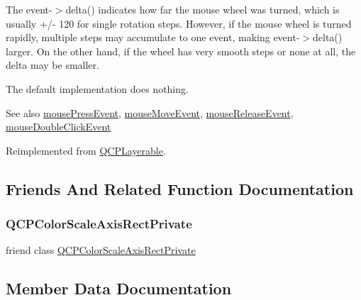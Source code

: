 The {\ttfamily event-\/$>$delta()} indicates how far the mouse wheel was turned, which is usually +/-\/ 120 for single rotation steps. However, if the mouse wheel is turned rapidly, multiple steps may accumulate to one event, making {\ttfamily event-\/$>$delta()} larger. On the other hand, if the wheel has very smooth steps or none at all, the delta may be smaller.

The default implementation does nothing.

\begin{DoxySeeAlso}{See also}
\hyperlink{class_q_c_p_color_scale_a91f633b97ffcd57fdf8cd814974c20e6}{mouse\+Press\+Event}, \hyperlink{class_q_c_p_color_scale_a3b2bd79725aefaf2630fc76e90939442}{mouse\+Move\+Event}, \hyperlink{class_q_c_p_color_scale_a6a35dd39ab4e5cb2d7b29ebb4d5b61b0}{mouse\+Release\+Event}, \hyperlink{class_q_c_p_layerable_a4171e2e823aca242dd0279f00ed2de81}{mouse\+Double\+Click\+Event} 
\end{DoxySeeAlso}


Reimplemented from \hyperlink{class_q_c_p_layerable_a47dfd7b8fd99c08ca54e09c362b6f022}{Q\+C\+P\+Layerable}.



\subsection{Friends And Related Function Documentation}
\mbox{\label{class_q_c_p_color_scale_a1441d8c09d7227c0c29a8d0a96d55bfe}} 
\subsubsection{\texorpdfstring{Q\+C\+P\+Color\+Scale\+Axis\+Rect\+Private}{QCPColorScaleAxisRectPrivate}}
{\footnotesize\ttfamily friend class \hyperlink{class_q_c_p_color_scale_axis_rect_private}{Q\+C\+P\+Color\+Scale\+Axis\+Rect\+Private}\hspace{0.3cm}{\ttfamily [friend]}}



\subsection{Member Data Documentation}
\mbox{\label{class_q_c_p_color_scale_a6e37f7d49cd614dc50ef1caae60461b9}} 
